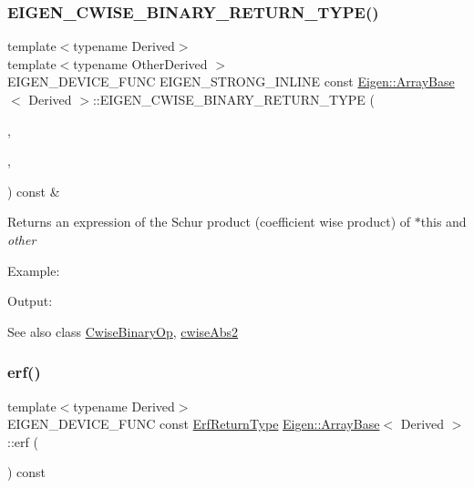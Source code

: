 \subsubsection{\texorpdfstring{EIGEN\_CWISE\_BINARY\_RETURN\_TYPE()}{EIGEN\_CWISE\_BINARY\_RETURN\_TYPE()}\hspace{0.1cm}{\footnotesize\ttfamily [2/2]}}
{\footnotesize\ttfamily template$<$typename Derived$>$ \\
template$<$typename Other\+Derived $>$ \\
E\+I\+G\+E\+N\+\_\+\+D\+E\+V\+I\+C\+E\+\_\+\+F\+U\+NC E\+I\+G\+E\+N\+\_\+\+S\+T\+R\+O\+N\+G\+\_\+\+I\+N\+L\+I\+NE const \mbox{\hyperlink{class_eigen_1_1_array_base}{Eigen\+::\+Array\+Base}}$<$ Derived $>$\+::E\+I\+G\+E\+N\+\_\+\+C\+W\+I\+S\+E\+\_\+\+B\+I\+N\+A\+R\+Y\+\_\+\+R\+E\+T\+U\+R\+N\+\_\+\+T\+Y\+PE (\begin{DoxyParamCaption}\item[{Derived}]{,  }\item[{Other\+Derived}]{,  }\item[{product}]{ }\end{DoxyParamCaption}) const \&\hspace{0.3cm}{\ttfamily [inline]}}

\begin{DoxyReturn}{Returns}
an expression of the Schur product (coefficient wise product) of $\ast$this and {\itshape other} 
\end{DoxyReturn}
Example\+: 
\begin{DoxyCodeInclude}{0}
\end{DoxyCodeInclude}
 Output\+: 
\begin{DoxyVerbInclude}
\end{DoxyVerbInclude}


\begin{DoxySeeAlso}{See also}
class \mbox{\hyperlink{class_eigen_1_1_cwise_binary_op}{Cwise\+Binary\+Op}}, \mbox{\hyperlink{class_eigen_1_1_array_base_aab34a23028035fd99c8b1a3ef54443f7}{cwise\+Abs2}} 
\end{DoxySeeAlso}
\mbox{\label{class_eigen_1_1_array_base_aa63d066102c083a96f0abec99a330f60}} 
\subsubsection{\texorpdfstring{erf()}{erf()}}
{\footnotesize\ttfamily template$<$typename Derived$>$ \\
E\+I\+G\+E\+N\+\_\+\+D\+E\+V\+I\+C\+E\+\_\+\+F\+U\+NC const \mbox{\hyperlink{class_eigen_1_1_cwise_unary_op}{Erf\+Return\+Type}} \mbox{\hyperlink{class_eigen_1_1_array_base}{Eigen\+::\+Array\+Base}}$<$ Derived $>$\+::erf (\begin{DoxyParamCaption}{ }\end{DoxyParamCaption}) const\hspace{0.3cm}{\ttfamily [inline]}}

